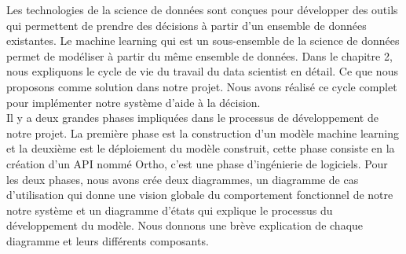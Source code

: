 \documentclass[12pt, french]{report}
\begin{document}
Les technologies de la science de données sont conçues pour développer des outils qui permettent de prendre des décisions à partir d'un ensemble de données existantes. Le machine learning qui est un sous-ensemble de la science de données permet de modéliser à partir du même ensemble de données. Dans le chapitre 2, nous expliquons le cycle de vie du travail du data scientist en détail. Ce que nous proposons comme solution dans notre projet. Nous avons réalisé ce cycle complet pour implémenter notre système d'aide à la décision. \\

Il y a deux grandes phases impliquées dans le processus de développement de notre projet. La première phase est la construction d'un modèle machine learning et la deuxième est le déploiement du modèle construit, cette phase consiste en la création d'un API nommé Ortho, c'est une phase d'ingénierie de logiciels. Pour les deux phases, nous avons crée deux diagrammes, un diagramme de cas d'utilisation qui donne une vision globale du comportement fonctionnel de notre notre système et un diagramme d'états qui explique le processus du développement du modèle. Nous donnons une brève explication de chaque diagramme et leurs différents composants. \\
\end{document}
